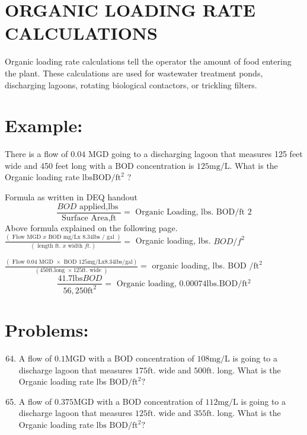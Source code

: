 \begin{enumerate}
\begin{enumerate}
\end{enumerate}
\section{ORGANIC LOADING RATE CALCULATIONS}
Organic loading rate calculations tell the operator the amount of food entering the plant. These calculations are used for wastewater treatment ponds, discharging lagoons, rotating biological contactors, or trickling filters.

\section{Example:}
There is a flow of $0.04$ MGD going to a discharging lagoon that measures 125 feet wide and 450 feet long with a BOD concentration is $125 \mathrm{mg} / \mathrm{L}$. What is the Organic loading rate $\mathrm{lbs} \mathrm{BOD} / \mathrm{ft}^{2}$ ?

Formula as written in DEQ handout
$$
\frac{B O D \text { applied,lbs }}{\text { Surface Area,ft }}=\text { Organic Loading, lbs. BOD/ft } 2
$$
Above formula explained on the following page. $\frac{(\text { Flow MGD } x \text { BOD mg/Lx 8.34lbs } / \text { gal })}{(\text { length ft. } x \text { width } f t .)}=$ Organic loading, lbs. $B O D / f^{2}$

$\frac{(\text { Flow } 0.04 \text { MGD } \times \text { BOD } 125 \mathrm{mg} / \mathrm{Lx} 8.34 \mathrm{lbs} / \mathrm{gal})}{(450 \mathrm{ft} \text {.long } \times 125 \mathrm{ft} \text {. wide })}=$ organic loading, lbs. BOD $/ \mathrm{ft}^{2}$
$$
\frac{41.7 \mathrm{lbs} B O D}{56,250 \mathrm{ft}^{2}}=\text { Organic loading, } 0.00074 \mathrm{lbs.} \mathrm{BOD} / \mathrm{ft}{ }^{2}
$$

\section{Problems:}
\begin{enumerate}
  \setcounter{enumi}{63}
  \item A flow of $0.1 \mathrm{MGD}$ with a BOD concentration of $108 \mathrm{mg} / \mathrm{L}$ is going to a discharge lagoon that measures $175 \mathrm{ft}$. wide and $500 \mathrm{ft}$. long. What is the Organic loading rate lbs $\mathrm{BOD} / \mathrm{ft}^{2} ?$

  \item A flow of $0.375 \mathrm{MGD}$ with a BOD concentration of $112 \mathrm{mg} / \mathrm{L}$ is going to a discharge lagoon that measures $125 \mathrm{ft}$. wide and $355 \mathrm{ft}$. long. What is the Organic loading rate $\mathrm{lbs}$ $\mathrm{BOD} / \mathrm{ft}^{2} ?$


\end{enumerate}
\end{enumerate}
